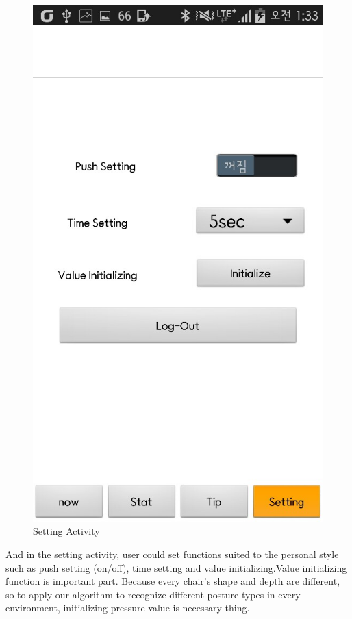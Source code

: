 \documentclass[conference]{IEEEtran}
\begin{document}
 \begin{figure}[H]
\begin{center}
    \includegraphics[scale=0.4]{setting}
    \caption{Setting Activity} 
\end{center}
\end{figure}

 And in the setting activity, user could set functions suited to the personal style such as push setting (on/off), time setting and value initializing.Value initializing function is important part. Because every chair's shape and depth are different, so to apply our algorithm to recognize different posture types in every environment, initializing pressure value is necessary thing. \\\\\\
 
\end{document}
